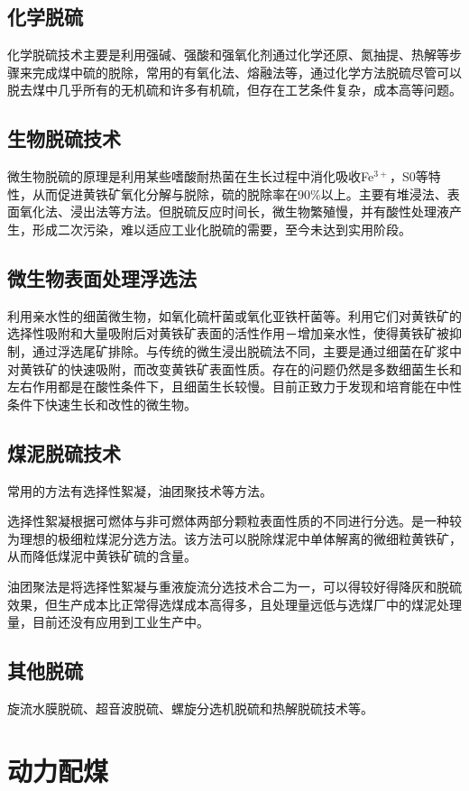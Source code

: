 \documentclass[10pt,openany]{ctexbook}
\begin{document}
  \subsection{化学脱硫}
  化学脱硫技术主要是利用强碱、强酸和强氧化剂通过化学还原、氮抽提、热解等步骤来完成煤中硫的脱除，常用的有氧化法、熔融法等，通过化学方法脱硫尽管可以脱去煤中几乎所有的无机硫和许多有机硫，但存在工艺条件复杂，成本高等问题。
   \subsection{生物脱硫技术}
   微生物脱硫的原理是利用某些嗜酸耐热菌在生长过程中消化吸收Fe$^{3+}$，S0等特性，从而促进黄铁矿氧化分解与脱除，硫的脱除率在90\%以上。主要有堆浸法、表面氧化法、浸出法等方法。但脱硫反应时间长，微生物繁殖慢，并有酸性处理液产生，形成二次污染，难以适应工业化脱硫的需要，至今未达到实用阶段。
   \subsection{微生物表面处理浮选法}
利用亲水性的细菌微生物，如氧化硫杆菌或氧化亚铁杆菌等。利用它们对黄铁矿的选择性吸附和大量吸附后对黄铁矿表面的活性作用－增加亲水性，使得黄铁矿被抑制，通过浮选尾矿排除。与传统的微生浸出脱硫法不同，主要是通过细菌在矿浆中对黄铁矿的快速吸附，而改变黄铁矿表面性质。存在的问题仍然是多数细菌生长和左右作用都是在酸性条件下，且细菌生长较慢。目前正致力于发现和培育能在中性条件下快速生长和改性的微生物。
 \subsection{煤泥脱硫技术}
 常用的方法有选择性絮凝，油团聚技术等方法。\par
   选择性絮凝根据可燃体与非可燃体两部分颗粒表面性质的不同进行分选。是一种较为理想的极细粒煤泥分选方法。该方法可以脱除煤泥中单体解离的微细粒黄铁矿，从而降低煤泥中黄铁矿硫的含量。\par
   油团聚法是将选择性絮凝与重液旋流分选技术合二为一，可以得较好得降灰和脱硫效果，但生产成本比正常得选煤成本高得多，且处理量远低与选煤厂中的煤泥处理量，目前还没有应用到工业生产中。



  \subsection{其他脱硫}
旋流水膜脱硫、超音波脱硫、螺旋分选机脱硫和热解脱硫技术等。
\section{动力配煤}
\end{document}
